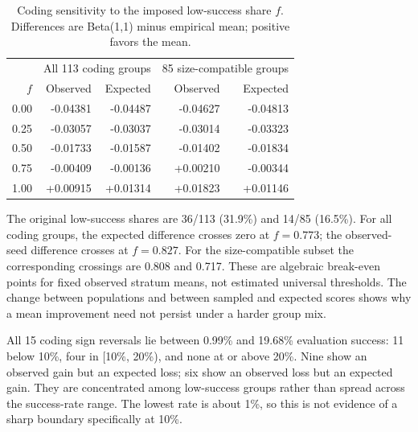 \documentclass{article}
\begin{document}
\begin{table}[ht]
\centering\small
\caption{Coding sensitivity to the imposed low-success share $f$.
Differences are Beta(1,1) minus empirical mean; positive favors the mean.}
\label{tab:reweight}
\begin{tabular}{rrrrr}
\toprule
& \multicolumn{2}{c}{All 113 coding groups} & \multicolumn{2}{c}{85 size-compatible groups} \\
$f$ & Observed & Expected & Observed & Expected \\
\midrule
0.00 & -0.04381 & -0.04487 & -0.04627 & -0.04813 \\
0.25 & -0.03057 & -0.03037 & -0.03014 & -0.03323 \\
0.50 & -0.01733 & -0.01587 & -0.01402 & -0.01834 \\
0.75 & -0.00409 & -0.00136 & +0.00210 & -0.00344 \\
1.00 & +0.00915 & +0.01314 & +0.01823 & +0.01146 \\
\bottomrule
\end{tabular}
\end{table}

The original low-success shares are 36/113 (31.9\%) and 14/85 (16.5\%).
For all coding groups, the expected difference crosses zero at $f=0.773$;
the observed-seed difference crosses at $f=0.827$. For the size-compatible
subset the corresponding crossings are 0.808 and 0.717. These are algebraic
break-even points for fixed observed stratum means, not estimated universal
thresholds. The change between populations and between sampled and expected
scores shows why a mean improvement need not persist under a harder group mix.

All 15 coding sign reversals lie between 0.99\% and 19.68\% evaluation
success: 11 below 10\%, four in [10\%, 20\%), and none at or above 20\%.
Nine show an observed gain but an expected loss; six show an observed loss
but an expected gain. They are concentrated among low-success groups rather
than spread across the success-rate range. The lowest rate is about 1\%, so
this is not evidence of a sharp boundary specifically at 10\%.

\clearpage
\end{document}
